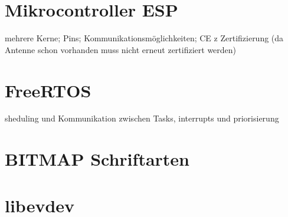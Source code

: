 \section{Mikrocontroller ESP}
mehrere Kerne; Pins; Kommunikationsmöglichkeiten; CE z
Zertifizierung (da Antenne schon vorhanden muss nicht erneut zertifiziert werden)

\section{FreeRTOS}
sheduling und Kommunikation zwischen Tasks, interrupts und priorisierung

\section{BITMAP Schriftarten}

\section{libevdev}
